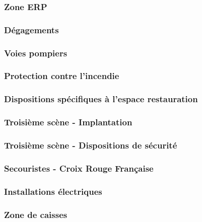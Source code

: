\documentclass{beamer}
\begin{document}
\begin{frame}

\frametitle{Zone ERP}

\end{frame}

\begin{frame}

\frametitle{Dégagements}

\end{frame}

\begin{frame}

\frametitle{Voies pompiers}

\end{frame}

\begin{frame}

\frametitle{Protection contre l'incendie}

\end{frame}

\begin{frame}

\frametitle{Dispositions spécifiques à l'espace restauration}

\end{frame}

\begin{frame}

\frametitle{Troisième scène - Implantation}

\end{frame}

\begin{frame}

\frametitle{Troisième scène - Dispositions de sécurité}

\end{frame}

\begin{frame}

\frametitle{Secouristes - Croix Rouge Française}

\end{frame}

\begin{frame}

\frametitle{Installations électriques}

\end{frame}

\begin{frame}

\frametitle{Zone de caisses}

\end{frame}
\end{document}
